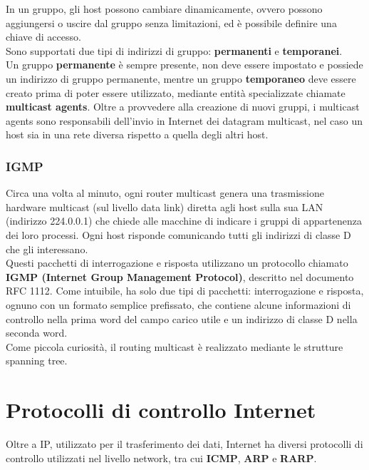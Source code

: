 \documentclass{article}
\begin{document}
        In un gruppo, gli host possono cambiare dinamicamente, ovvero possono aggiungersi o uscire
        dal gruppo senza limitazioni, ed è possibile definire una chiave di accesso.\\

        Sono supportati due tipi di indirizzi di gruppo: \textbf{permanenti} e \textbf{temporanei}.\\
        
        Un gruppo \textbf{permanente} è sempre presente, non deve essere impostato e possiede un indirizzo
        di gruppo permanente, mentre un gruppo \textbf{temporaneo} deve essere creato prima di poter
        essere utilizzato, mediante entità specializzate chiamate \textbf{multicast agents}. Oltre a provvedere
        alla creazione di nuovi gruppi, i multicast agents sono responsabili dell’invio in Internet dei
        datagram multicast, nel caso un host sia in una rete diversa rispetto a quella degli altri host.

            \subsubsection*{IGMP}
            Circa una volta al minuto, ogni router multicast genera una trasmissione hardware multicast
            (sul livello data link) diretta agli host sulla sua LAN (indirizzo 224.0.0.1) che chiede alle
            macchine di indicare i gruppi di appartenenza dei loro processi. Ogni host risponde
            comunicando tutti gli indirizzi di classe D che gli interessano.\\
            
            Questi pacchetti di interrogazione e risposta utilizzano un protocollo chiamato \textbf{IGMP (Internet
            Group Management Protocol)}, descritto nel documento RFC 1112. Come intuibile, ha solo due
            tipi di pacchetti: interrogazione e risposta, ognuno con un formato semplice prefissato, che
            contiene alcune informazioni di controllo nella prima word del campo carico utile e un indirizzo
            di classe D nella seconda word.\\
            
            Come piccola curiosità, il routing multicast è realizzato mediante le strutture spanning tree.
            
    \section{Protocolli di controllo Internet}
    Oltre a IP, utilizzato per il trasferimento dei dati, Internet ha diversi protocolli di controllo
    utilizzati nel livello network, tra cui \textbf{ICMP}, \textbf{ARP} e \textbf{RARP}.
\end{document}
